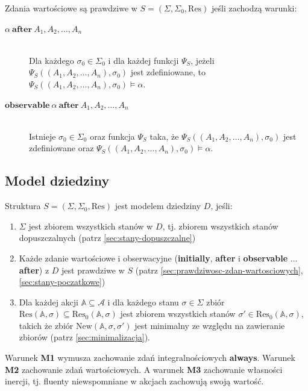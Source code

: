 \documentclass[11pt,a4paper]{article}
\theoremstyle{definition}
\begin{document}
Zdania wartościowe są prawdziwe w $S = (\Sigma, \Sigma_0, \mathrm{Res})$ jeśli zachodzą warunki:

\begin{description}
    \item[$\alpha \ \textbf{after} \ A_1, A_2, \dots, A_n$] \hfill \\
        Dla każdego $\sigma_0 \in \Sigma_0$ i dla każdej funkcji $\Psi_S$, jeżeli $\Psi_S((A_1, A_2, \dots, A_n), \sigma_0)$ jest zdefiniowane, to $\Psi_S((A_1, A_2, \dots, A_n), \sigma_0) \models \alpha$.
    \item[$\textbf{observable} \  \alpha \ \textbf{after} \ A_1, A_2, \dots, A_n$] \hfill \\
        Istnieje $\sigma_0 \in \Sigma_0$ oraz funkcja $\Psi_S$ taka, że $\Psi_S((A_1, A_2, \dots, A_n), \sigma_0)$ jest zdefiniowane oraz $\Psi_S((A_1, A_2, \dots, A_n), \sigma_0) \models \alpha$.
\end{description}

\subsection{Model dziedziny}
\label{sec:model-dziedziny}

Struktura $S = (\Sigma, \Sigma_0, \mathrm{Res})$ jest modelem dziedziny $D$, jeśli:

\begin{enumerate}[label=\textbf{(M\arabic*)}]
    \item $\Sigma$ jest zbiorem wszystkich stanów w $D$, tj. zbiorem wszystkich stanów dopuszczalnych (patrz \ref{sec:stany-dopuszczalne})
    \item Każde zdanie wartościowe i obserwacyjne (\textbf{initially}, \textbf{after} i \textbf{observable} ... \textbf{after}) z $D$ jest prawdziwe w $S$ (patrz \ref{sec:prawdziwosc-zdan-wartosciowych}, \ref{sec:stany-poczatkowe})
    \item Dla każdej akcji $\mathbb{A} \subseteq \mathcal{A}$ i dla każdego stanu $\sigma \in \Sigma$ zbiór $\mathrm{Res}(\mathbb{A}, \sigma) \subseteq \mathrm{Res}_0(\mathbb{A}, \sigma)$ jest zbiorem wszystkich stanów $\sigma' \in \mathrm{Res}_0(\mathbb{A}, \sigma)$, takich że zbiór $\mathrm{New}(\mathbb{A}, \sigma, \sigma')$ jest minimalny ze względu na zawieranie zbiorów (patrz \ref{sec:minimalizacja}).
\end{enumerate}

Warunek \textbf{M1} wymusza zachowanie zdań integralnościowych \textbf{always}. Warunek \textbf{M2} zachowanie zdań wartościowych. A warunek \textbf{M3} zachowanie własności inercji, tj. fluenty niewspomniane w akcjach zachowują swoją wartość.
\end{document}
